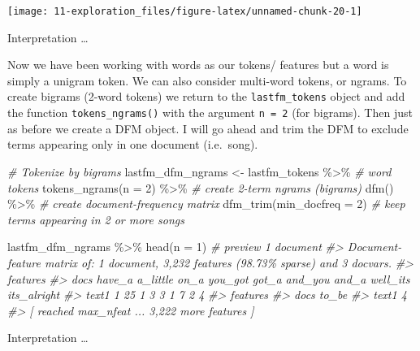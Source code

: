 \documentclass[
]{article}
\newenvironment{Shaded}{\begin{snugshade}}{\end{snugshade}}
\newcommand{\AttributeTok}[1]{\textcolor[rgb]{0.77,0.63,0.00}{#1}}
\newcommand{\CommentTok}[1]{\textcolor[rgb]{0.56,0.35,0.01}{\textit{#1}}}
\newcommand{\DecValTok}[1]{\textcolor[rgb]{0.00,0.00,0.81}{#1}}
\newcommand{\FunctionTok}[1]{\textcolor[rgb]{0.00,0.00,0.00}{#1}}
\newcommand{\NormalTok}[1]{#1}
\newcommand{\OtherTok}[1]{\textcolor[rgb]{0.56,0.35,0.01}{#1}}
\newcommand{\SpecialCharTok}[1]{\textcolor[rgb]{0.00,0.00,0.00}{#1}}
\begin{document}
\begin{center}\texttt{[image: 11-exploration\_files/figure-latex/unnamed-chunk-20-1]} \end{center}

Interpretation \ldots{}

Now we have been working with words as our tokens/ features but a word is simply a unigram token. We can also consider multi-word tokens, or ngrams. To create bigrams (2-word tokens) we return to the \texttt{lastfm\_tokens} object and add the function \texttt{tokens\_ngrams()} with the argument \texttt{n\ =\ 2} (for bigrams). Then just as before we create a DFM object. I will go ahead and trim the DFM to exclude terms appearing only in one document (i.e.~song).

\begin{Shaded}
\begin{Highlighting}[]
\CommentTok{\# Tokenize by bigrams}
\NormalTok{lastfm\_dfm\_ngrams }\OtherTok{\textless{}{-}} 
\NormalTok{  lastfm\_tokens }\SpecialCharTok{\%\textgreater{}\%} \CommentTok{\# word tokens}
  \FunctionTok{tokens\_ngrams}\NormalTok{(}\AttributeTok{n =} \DecValTok{2}\NormalTok{) }\SpecialCharTok{\%\textgreater{}\%} \CommentTok{\# create 2{-}term ngrams (bigrams)}
  \FunctionTok{dfm}\NormalTok{() }\SpecialCharTok{\%\textgreater{}\%} \CommentTok{\# create document{-}frequency matrix}
  \FunctionTok{dfm\_trim}\NormalTok{(}\AttributeTok{min\_docfreq =} \DecValTok{2}\NormalTok{) }\CommentTok{\# keep terms appearing in 2 or more songs}

\NormalTok{lastfm\_dfm\_ngrams }\SpecialCharTok{\%\textgreater{}\%} 
  \FunctionTok{head}\NormalTok{(}\AttributeTok{n =} \DecValTok{1}\NormalTok{) }\CommentTok{\# preview 1 document}
\CommentTok{\#\textgreater{} Document{-}feature matrix of: 1 document, 3,232 features (98.73\% sparse) and 3 docvars.}
\CommentTok{\#\textgreater{}        features}
\CommentTok{\#\textgreater{} docs    have\_a a\_little on\_a you\_got got\_a and\_you and\_a well\_it\textquotesingle{}s it\textquotesingle{}s\_alright}
\CommentTok{\#\textgreater{}   text1      1       25    1       3     3       1     7         2            4}
\CommentTok{\#\textgreater{}        features}
\CommentTok{\#\textgreater{} docs    to\_be}
\CommentTok{\#\textgreater{}   text1     4}
\CommentTok{\#\textgreater{} [ reached max\_nfeat ... 3,222 more features ]}
\end{Highlighting}
\end{Shaded}

Interpretation \ldots{}
\end{document}
